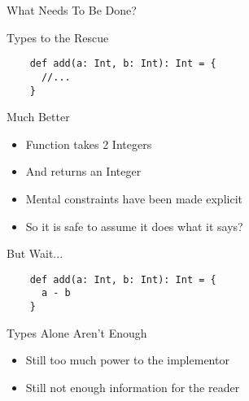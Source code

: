 \begin{section}{What Needs To Be Done?}
\begin{frame}[fragile]{Types to the Rescue}
  \begin{verbatim}
    def add(a: Int, b: Int): Int = {
      //...
    }
  \end{verbatim}
\end{frame}

\begin{frame}[fragile]{Much Better}
  \begin{itemize}
  \item Function takes 2 Integers
  \item And returns an Integer
  \item Mental constraints have been made explicit
  \item So it is safe to assume it does what it says?
  \end{itemize}
\end{frame}

\begin{frame}[fragile]{But Wait...}
  \begin{verbatim}
    def add(a: Int, b: Int): Int = {
      a - b
    }
  \end{verbatim}
\end{frame}

\begin{frame}[fragile]{Types Alone Aren't Enough}
  \begin{itemize}
  \item Still too much power to the implementor
  \item Still not enough information for the reader
  \end{itemize}
\end{frame}

\end{section}
